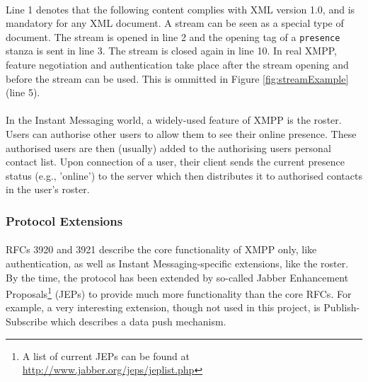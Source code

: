 \paragraph{}
Line 1 denotes that the following content complies with XML version 1.0, and is mandatory for any XML document. A stream can be seen as a special type of document. The stream is opened in line 2 and the opening tag of a \texttt{presence} stanza is sent in line 3. The stream is closed again in line 10. In real XMPP, feature negotiation and authentication take place after the stream opening and before the stream can be used. This is ommitted in Figure \ref{fig:streamExample} (line 5).
\paragraph{}
In the Instant Messaging world, a widely-used feature of XMPP is the roster. Users can authorise other users to allow them to see their online presence. These authorised users are then (usually) added to the authorising users personal contact list. Upon connection of a user, their client sends the current presence status (e.g., 'online') to the server which then distributes it to authorised contacts in the user's roster.

\subsubsection{Protocol Extensions}
\paragraph{}
RFCs 3920 and 3921 describe the core functionality of XMPP only, like authentication, as well as Instant Messaging-specific extensions, like the roster. By the time, the protocol has been extended by so-called Jabber Enhancement Proposals\footnote{A list of current JEPs can be found at \href{http://www.jabber.org/jeps/jeplist.php}{http://www.jabber.org/jeps/jeplist.php}} (JEPs) to provide much more functionality than the core RFCs. For example, a very interesting extension, though not used in this project, is Publish-Subscribe \cite{jep0060} which describes a data push mechanism.
